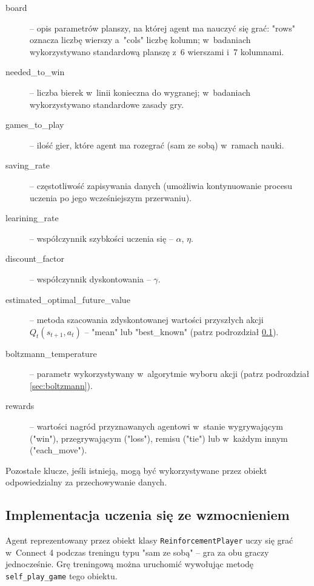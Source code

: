 \documentclass[a4paper, 12pt, oneside]{report}
\begin{document}
\begin{description}
\item[board] -- opis parametrów planszy, na której agent ma nauczyć się grać: "rows" oznacza liczbę wierszy a~"cols" liczbę kolumn; w~badaniach wykorzystywano standardową planszę z~6 wierszami i~7 kolumnami.
\item[needed\_to\_win] -- liczba bierek w~linii konieczna do wygranej; w~badaniach wykorzystywano standardowe zasady gry.
\item[games\_to\_play] -- ilość gier, które agent ma rozegrać (sam ze sobą) w~ramach nauki.
\item[saving\_rate] -- częstotliwość zapisywania danych (umożliwia kontynuowanie procesu uczenia po jego wcześniejszym przerwaniu).
\item[learining\_rate] -- współczynnik szybkości uczenia się -- $\alpha$, $\eta$.
\item[discount\_factor] -- współczynnik dyskontowania -- $\gamma$.
\item[estimated\_optimal\_future\_value] -- metoda szacowania zdyskontowanej wartości przyszłych akcji $Q_t(s_{t+1}, a_t)$ -- "mean" lub "best\_known" (patrz podrozdział \ref{subsec:agent_implementacja}).
\item[boltzmann\_temperature] -- parametr wykorzystywany w~algorytmie wyboru akcji (patrz podrozdział \ref{sec:boltzmann}).
\item[rewards] -- wartości nagród przyznawanych agentowi w~stanie wygrywającym ("win"), przegrywającym ("loss"), remisu ("tie") lub w~każdym innym ("each\_move").
\end{description}

Pozostałe klucze, jeśli istnieją, mogą być wykorzystywane przez obiekt odpowiedzialny za przechowywanie danych.

\subsection{Implementacja uczenia się ze wzmocnieniem}
\label{subsec:agent_implementacja}

Agent reprezentowany przez obiekt klasy \texttt{ReinforcementPlayer} uczy się grać w~Connect 4 podczas treningu typu "sam ze sobą" -- gra za obu graczy jednocześnie. Grę treningową można uruchomić wywołując metodę \texttt{self\_play\_game} tego obiektu.

\needspace{5em}


\end{document}
